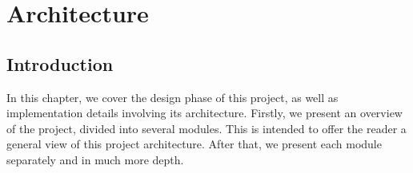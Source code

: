 \chapter{Architecture}
\label{chap:architecture}


\section{Introduction}
\label{sec:introduction}
In this chapter, we cover the design phase of this project, as well as implementation details involving its architecture. Firstly, we present an overview of the project, divided into several modules. This is intended to offer the reader a general view of this project architecture. After that, we present each module separately and in much more depth.


